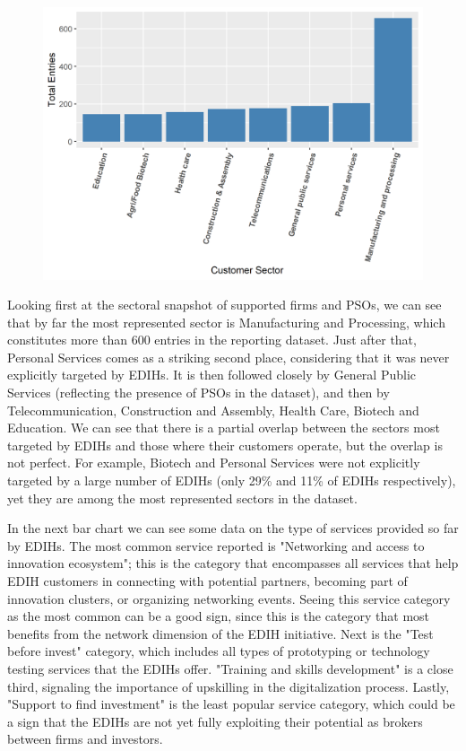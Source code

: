 \documentclass[12pt]{report}
\begin{document}
\begin{figure}[h]
    \centering
    \includegraphics[width=0.8\linewidth]{../Output/cust_sector_plot.png}
    \caption{}
    \label{fig:edih-customersector-table}
\end{figure}

\par Looking first at the sectoral snapshot of supported firms and PSOs, we can see that by far the most represented sector is Manufacturing and Processing, which constitutes more than 600 entries in the reporting dataset. Just after that, Personal Services comes as a striking second place, considering that it was never explicitly targeted by EDIHs. It is then followed closely by General Public Services (reflecting the presence of PSOs in the dataset), and then by Telecommunication, Construction and Assembly, Health Care, Biotech and Education. We can see that there is a partial overlap between the sectors most targeted by EDIHs and those where their customers operate, but the overlap is not perfect. For example, Biotech and Personal Services were not explicitly targeted by a large number of EDIHs (only 29\% and 11\% of EDIHs respectively), yet they are among the most represented sectors in the dataset.


\par In the next bar chart we can see some data on the type of services provided so far by EDIHs. The most common service reported is "Networking and access to innovation ecosystem"; this is the category that encompasses all services that help EDIH customers in connecting with potential partners, becoming part of innovation clusters, or organizing networking events. Seeing this service category as the most common can be a good sign, since this is the category that most benefits from the network dimension of the EDIH initiative. Next is the "Test before invest" category, which includes all types of prototyping or technology testing services that the EDIHs offer. "Training and skills development" is a close third, signaling the importance of upskilling in the digitalization process. Lastly, "Support to find investment" is the least popular service category, which could be a sign that the EDIHs are not yet fully exploiting their potential as brokers between firms and investors.
\end{document}
